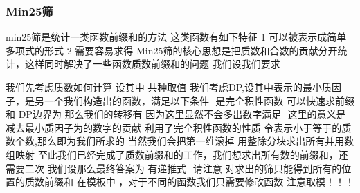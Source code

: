 \documentclass[8pt,a4paper]{article}
\newcommand{\code}[1]{
    
}
\newcommand{\txt}[1]{\par\noindent\footnotesize #1}
\newcommand{\inlineformula}[1]{\ensuremath{}}
\newcommand{\displayformula}[1]{%
    \vspace{0.2em}
    \[
        
    \]
}
\begin{document}
\begin{multicols}{2}
        \subsubsection{Min25筛}
            \txt{min25筛是统计一类函数前缀和的方法
这类函数有如下特征
1 \inlineformula{./assets/formulas_tex/formula_171.tex}可以被表示成简单多项式的形式
2 \inlineformula{./assets/formulas_tex/formula_172.tex}需要容易求得
Min25筛的核心思想是把质数和合数的贡献分开统计，这样同时解决了一些函数质数前缀和的问题
我们设我们要求\displayformula{./assets/formulas_tex/formula_173.tex}
我们先考虑质数如何计算 设\inlineformula{./assets/formulas_tex/formula_174.tex}其中\inlineformula{./assets/formulas_tex/formula_175.tex}
共\inlineformula{./assets/formulas_tex/formula_176.tex}种取值
我们考虑DP,设\inlineformula{./assets/formulas_tex/formula_177.tex}其中\inlineformula{./assets/formulas_tex/formula_178.tex}表示\inlineformula{./assets/formulas_tex/formula_179.tex}的最小质因子，\inlineformula{./assets/formulas_tex/formula_180.tex}是另一个我们构造出的函数，满足以下条件
\inlineformula{./assets/formulas_tex/formula_181.tex}
\inlineformula{./assets/formulas_tex/formula_182.tex}是完全积性函数
\inlineformula{./assets/formulas_tex/formula_183.tex}可以快速求前缀和
DP边界为\inlineformula{./assets/formulas_tex/formula_184.tex}
那么我们的转移有
\inlineformula{./assets/formulas_tex/formula_185.tex}因为这里显然不会多出数字满足\inlineformula{./assets/formulas_tex/formula_186.tex}
\inlineformula{./assets/formulas_tex/formula_187.tex}
这里的意义是减去最小质因子为\inlineformula{./assets/formulas_tex/formula_188.tex}的数字的贡献 利用了完全积性函数的性质
令\inlineformula{./assets/formulas_tex/formula_189.tex}表示小于等于\inlineformula{./assets/formulas_tex/formula_190.tex}的质数个数,那么\inlineformula{./assets/formulas_tex/formula_191.tex}即为我们所求的\inlineformula{./assets/formulas_tex/formula_192.tex}
当然我们会把第一维滚掉 用整除分块求出所有\inlineformula{./assets/formulas_tex/formula_193.tex}并用\inlineformula{./assets/formulas_tex/formula_194.tex}数组映射
至此我们已经完成了质数前缀和的工作，我们想求出所有数的前缀和，还需要二次\inlineformula{./assets/formulas_tex/formula_195.tex}
我们设\inlineformula{./assets/formulas_tex/formula_196.tex}那么最终答案为\inlineformula{./assets/formulas_tex/formula_197.tex}
有递推式
\inlineformula{./assets/formulas_tex/formula_198.tex}
请注意 对\inlineformula{./assets/formulas_tex/formula_199.tex}求出的\inlineformula{./assets/formulas_tex/formula_200.tex}筛只能得到所有的\inlineformula{./assets/formulas_tex/formula_201.tex}位置的质数前缀和
在模板中 \inlineformula{./assets/formulas_tex/formula_202.tex}，对于不同的函数我们只需要修改\inlineformula{./assets/formulas_tex/formula_203.tex}函数
注意取模！！！}
            \code{src/number_theory/数论定理_17_5.cpp}

\end{multicols}
\end{document}
